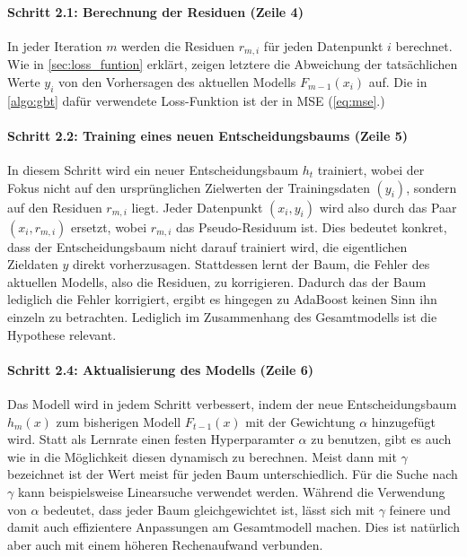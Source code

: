 \paragraph{Schritt 2.1: Berechnung der Residuen (Zeile 4)}
In jeder Iteration \( m \) werden die Residuen \( r_{m,i} \) für jeden Datenpunkt \( i \) berechnet. Wie in \autoref{sec:loss_funtion} erklärt, zeigen letztere die Abweichung der tatsächlichen Werte \( y_i \) von den Vorhersagen des aktuellen Modells \( F_{m-1}(x_i) \) auf. Die in \autoref{algo:gbt} dafür verwendete Loss-Funktion ist der in MSE (\ref{eq:mse}.)

\paragraph{Schritt 2.2: Training eines neuen Entscheidungsbaums (Zeile 5)}
\label{para:GBT_training_tree}
In diesem Schritt wird ein neuer Entscheidungsbaum \( h_t \) trainiert, wobei der Fokus nicht auf den ursprünglichen Zielwerten der Trainingsdaten \( (y_i) \), sondern auf den Residuen \( r_{m,i} \) liegt. Jeder Datenpunkt \( (x_i, y_i) \) wird also durch das Paar \( (x_i, r_{m,i}) \) ersetzt, wobei \( r_{m,i} \) das Pseudo-Residuum ist.
\newline
Dies bedeutet konkret, dass der Entscheidungsbaum nicht darauf trainiert wird, die eigentlichen Zieldaten \( y \) direkt vorherzusagen. Stattdessen lernt der Baum, die Fehler des aktuellen Modells, also die Residuen, zu korrigieren. Dadurch das der Baum lediglich die Fehler korrigiert, ergibt es hingegen zu AdaBoost keinen Sinn ihn einzeln zu betrachten. Lediglich im Zusammenhang des Gesamtmodells ist die Hypothese relevant.

\paragraph{Schritt 2.4: Aktualisierung des Modells (Zeile 6)}
Das Modell wird in jedem Schritt verbessert, indem der neue Entscheidungsbaum \( h_m(x) \) zum bisherigen Modell \( F_{t-1}(x) \) mit der Gewichtung \( \alpha \) hinzugefügt wird. Statt als Lernrate einen festen Hyperparamter \( \alpha \) zu benutzen, gibt es auch wie in \textcite[S.~345]{Frochte2020} die Möglichkeit diesen dynamisch zu berechnen. Meist dann mit \( \gamma \) bezeichnet ist der Wert meist für jeden Baum unterschiedlich. Für die Suche nach \( \gamma \) kann beispielsweise Linearsuche verwendet werden.
\newline
\newline
Während die Verwendung von \( \alpha \) bedeutet, dass jeder Baum gleichgewichtet ist, lässt sich mit \( \gamma \) feinere und damit auch effizientere Anpassungen am Gesamtmodell machen. Dies ist natürlich aber auch mit einem höheren Rechenaufwand verbunden.

